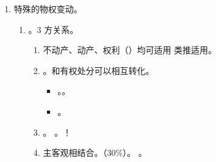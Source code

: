\begin{enumerate}
\begin{enumerate}
\begin{enumerate}
\begin{enumerate}
                          \item 事实行为。合法建造完成时。
                                \begin{itemize}
                                  \item {}。
                                  \item {}。
                                \end{itemize}
                          \item \sjt 能处分，但某些处分需要办理过户登记（\bdy 登记）的，未经过户登记，不发生物权效力。
                          \item {}。
                          \item {}。
                        \end{enumerate}
                \end{enumerate}
          \item 特殊的物权变动。
                \begin{enumerate}
                  \item {}。3 方关系。
                        \begin{enumerate}
                          \item 不动产、动产、权利（）均可适用 \hz 类推适用。
                          \item {}。和有权处分可以相互转化。
                                \begin{itemize}
                                  \item {}。。
                                  \item {}。
                                \end{itemize}
                          \item {}。 \yjt {}。！
                          \item 主客观相结合。（30\%）。
                                。

\end{enumerate}
\end{enumerate}
\end{enumerate}
\end{enumerate}
